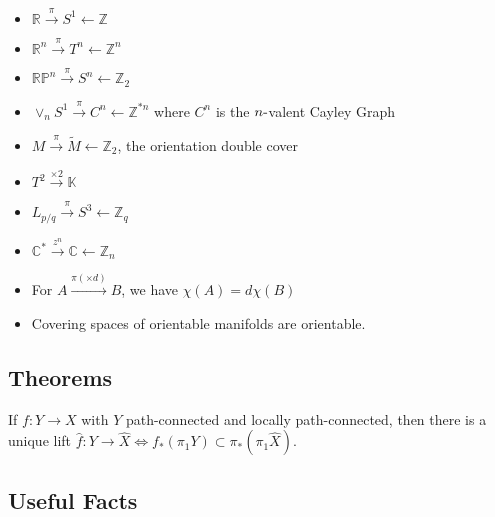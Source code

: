 \begin{itemize}
\item
  \({\mathbb{R}}\xrightarrow{\pi} S^1 \leftarrow {\mathbb{Z}}\)
\item
  \({\mathbb{R}}^n \xrightarrow{\pi} T^n \leftarrow {\mathbb{Z}}^n\)
\item
  \({\mathbb{RP}}^n \xrightarrow{\pi} S^n \leftarrow {\mathbb{Z}}_2\)
\item
  \(\vee_n S^1 \xrightarrow{\pi} C^n \leftarrow {\mathbb{Z}}^{\ast n}\)
  where \(C^n\) is the \(n{\hbox{-}}\)valent Cayley Graph
\item
  \(M \xrightarrow{\pi} \tilde M \leftarrow {\mathbb{Z}}_2\), the
  orientation double cover
\item
  \(T^2 \xrightarrow{\times 2} {\mathbb{K}}\)
\item
  \(L_{p/q} \xrightarrow{\pi} S^3 \leftarrow {\mathbb{Z}}_q\)
\item
  \({\mathbb{C}}^* \xrightarrow{z^n} {\mathbb{C}}\leftarrow {\mathbb{Z}}_n\)
\item
  For \(A \xrightarrow{\pi(\times d)} B\), we have
  \(\chi(A) = d\chi(B)\)
\item
  Covering spaces of orientable manifolds are orientable.
\end{itemize}

\hypertarget{theorems-1}{%
\subsection{Theorems}\label{theorems-1}}

\begin{theorem}

If \(f: Y\to X\) with \(Y\) path-connected and locally path-connected,
then there is a unique lift
\(\widehat{f}: Y\to \widehat{X} \iff f_*(\pi_1 Y) \subset \pi_*(\pi_1 \widehat{X})\).

\end{theorem}

\hypertarget{useful-facts}{%
\subsection{Useful Facts}\label{useful-facts}}

